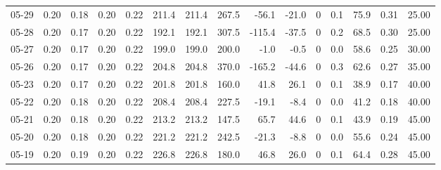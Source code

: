 \begin{threeparttable}
{\begin{tabular}{lrrrrrrrrrrrrrr}
  05-29 &          0.20 &          0.18 &          0.20 &        0.22 &               211.4 &              211.4 &               267.5 &      -56.1 &        -21.0 &              0 &                 0.1 &             75.9 &            0.31 &                  25.00 \\
  05-28 &          0.20 &          0.17 &          0.20 &        0.22 &               192.1 &              192.1 &               307.5 &     -115.4 &        -37.5 &              0 &                 0.2 &             68.5 &            0.30 &                  25.00 \\
  05-27 &          0.20 &          0.17 &          0.20 &        0.22 &               199.0 &              199.0 &               200.0 &       -1.0 &         -0.5 &              0 &                 0.0 &             58.6 &            0.25 &                  30.00 \\
  05-26 &          0.20 &          0.17 &          0.20 &        0.22 &               204.8 &              204.8 &               370.0 &     -165.2 &        -44.6 &              0 &                 0.3 &             62.6 &            0.27 &                  35.00 \\
  05-23 &          0.20 &          0.17 &          0.20 &        0.22 &               201.8 &              201.8 &               160.0 &       41.8 &         26.1 &              0 &                 0.1 &             38.9 &            0.17 &                  40.00 \\
  05-22 &          0.20 &          0.18 &          0.20 &        0.22 &               208.4 &              208.4 &               227.5 &      -19.1 &         -8.4 &              0 &                 0.0 &             41.2 &            0.18 &                  40.00 \\
  05-21 &          0.20 &          0.18 &          0.20 &        0.22 &               213.2 &              213.2 &               147.5 &       65.7 &         44.6 &              0 &                 0.1 &             43.9 &            0.19 &                  45.00 \\
  05-20 &          0.20 &          0.18 &          0.20 &        0.22 &               221.2 &              221.2 &               242.5 &      -21.3 &         -8.8 &              0 &                 0.0 &             55.6 &            0.24 &                  45.00 \\
  05-19 &          0.20 &          0.19 &          0.20 &        0.22 &               226.8 &              226.8 &               180.0 &       46.8 &         26.0 &              0 &                 0.1 &             64.4 &            0.28 &                  45.00 \\

\end{tabular}}
\end{threeparttable}
